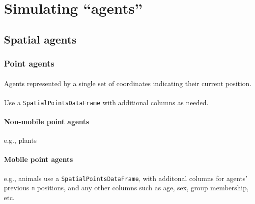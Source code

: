 \documentclass{article}
\begin{document}
\newpage

\section{Simulating ``agents''}

\paragraph{}

\subsection{Spatial agents}

\subsubsection{Point agents}

\paragraph{}
Agents represented by a single set of coordinates indicating their current position.

\paragraph{}
Use a \texttt{SpatialPointsDataFrame} with additional columns as needed.

\paragraph{Non-mobile point agents}
e.g., plants

\paragraph{Mobile point agents}
e.g., animals use a \texttt{SpatialPointsDataFrame}, with additonal columns for agents' previous \texttt{n} positions, and any other columns such as age, sex, group membership, etc.
\end{document}
